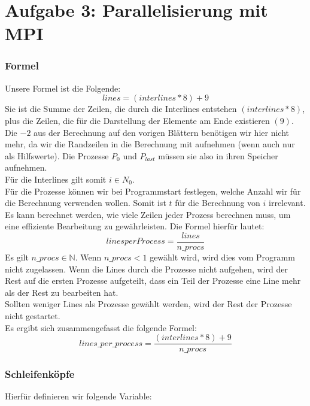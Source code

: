 \documentclass[12pt]{article}
\begin{document}
\begin{sloppypar}
\begin{figure}[ht]
\begin{minipage}[t]{0.12\textwidth}
    \end{minipage}
\end{figure}


\section{Aufgabe 3: Parallelisierung mit MPI}
\subsubsection*{Formel}
Unsere Formel ist die Folgende:
\begin{equation}
    lines = (interlines * 8) + 9
\end{equation}
Sie ist die Summe der Zeilen, die durch die Interlines entstehen $(interlines * 8)$, 
plus die Zeilen, die für die Darstellung der Elemente am Ende existieren $(9)$. Die $-2$ aus der Berechnung auf den vorigen Blättern benötigen wir hier nicht mehr, da wir die Randzeilen in die Berechnung mit aufnehmen (wenn auch nur als Hilfswerte). Die Prozesse $P_0$ und $P_{last}$ müssen sie also in ihren Speicher aufnehmen. \\

Für die Interlines gilt somit $i \in N_0$. \\
Für die Prozesse können wir bei Programmstart festlegen, welche Anzahl wir für die Berechnung
verwenden wollen. Somit ist $t$ für die Berechnung von $i$ irrelevant. Es kann berechnet 
werden, wie viele Zeilen jeder Prozess berechnen muss, um eine effiziente Bearbeitung 
zu gewährleisten. Die Formel hierfür lautet:
\begin{equation}
    lines per Process = \frac{lines}{n\_procs}
\end{equation}
Es gilt $n\_procs \in \mathbb{N}$. Wenn $n\_procs < 1$ gewählt wird, wird dies vom Programm nicht zugelassen. Wenn die Lines durch die Prozesse nicht aufgehen, wird der Rest auf die ersten Prozesse aufgeteilt, dass ein Teil der Prozesse eine Line mehr als der Rest zu bearbeiten hat. \\
Sollten weniger Lines als Prozesse gewählt werden, wird der Rest der Prozesse nicht gestartet. \\
Es ergibt sich zusammengefasst die folgende Formel:
\begin{equation}
    lines\_per\_process = \frac{(interlines * 8) + 9}{n\_procs}
\end{equation}

\subsubsection*{Schleifenköpfe}
Hierfür definieren wir folgende Variable: \\


\end{sloppypar}
\end{document}
